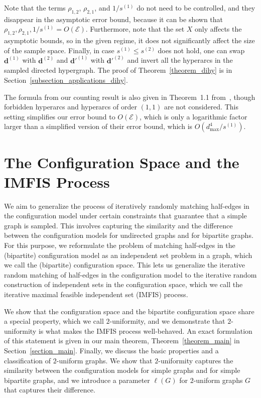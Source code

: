 \documentclass{article}
\theoremstyle{plain}
\theoremstyle{remark}
\theoremstyle{plain}
\numberwithin{equation}{section}
\renewcommand{\d}{{\boldsymbol{d}}}
\begin{document}
	Note that the terms $\rho_{1,2}$, $\rho_{2,1}$, and $1/s^{(1)}$ do not need to be controlled, and they disappear in the asymptotic error bound, because it can be shown that $\rho_{1,2},\rho_{2,1},1/s^{(1)}=O(\mathscr{E})$. Furthermore, note that the set $X$ only affects the asymptotic bounds, so in the given regime, it does not significantly affect the size of the sample space. Finally, in case $s^{(1)}\leq s^{(2)}$ does not hold, one can swap $\d^{(1)}$ with $\d^{(2)}$ and $\d'^{(1)}$ with $\d'^{(2)}$ and invert all the hyperarcs in the sampled directed hypergraph. The proof of Theorem~\ref{theorem_dihy} is in Section~\ref{subsection_applications_dihy}.
	
	The formula from our counting result is also given in Theorem~1.1 from~\cite{greenhill2024enumerationdihypergraphsspecifieddegrees}, though forbidden hyperarcs and hyperarcs of order $(1,1)$ are not considered. This setting simplifies our error bound to $O(\mathscr{E})$, which is only a logarithmic factor larger than a simplified version of their error bound, which is $O(d_{\max}^4/s^{(1)})$.
	
	
	\section{The Configuration Space and the IMFIS Process}\label{section_independent}
	
	
	We aim to generalize the process of iteratively randomly matching half-edges in the configuration model under certain constraints that guarantee that a simple graph is sampled. This involves capturing the similarity and the difference between the configuration models for undirected graphs and for bipartite graphs. For this purpose, we reformulate the problem of matching half-edges in the (bipartite) configuration model as an independent set problem in a graph, which we call the (bipartite) configuration space. This lets us generalize the iterative random matching of half-edges in the configuration model to the iterative random construction of independent sets in the configuration space, which we call the iterative maximal feasible independent set (IMFIS) process.
	
	We show that the configuration space and the bipartite configuration space share a special property, which we call $2$-uniformity, and we demonstrate that $2$-uniformity is what makes the IMFIS process well-behaved. An exact formulation of this statement is given in our main theorem, Theorem~\ref{theorem_main} in Section~\ref{section_main}. Finally, we discuss the basic properties and a classification of $2$-uniform graphs. We show that $2$-uniformity captures the similarity between the configuration models for simple graphs and for simple bipartite graphs, and we introduce a parameter $\ell(G)$ for $2$-uniform graphs $G$ that captures their difference.
	
\end{document}
